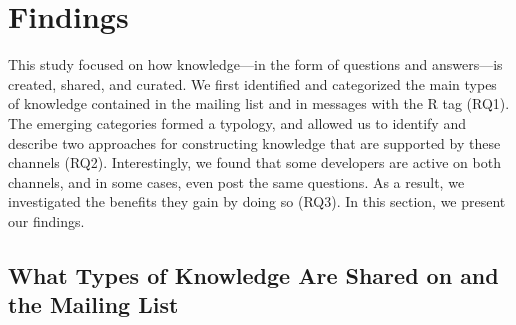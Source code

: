 \section{Findings}
\label{cha:findings}
This study focused on how knowledge---in the form of questions and answers---is created, shared, and curated. We first identified and categorized the main types of knowledge contained in the \RH mailing list and in \SO messages with the R tag (RQ1). The emerging categories formed a typology, and allowed us to identify and describe two approaches for constructing knowledge that are supported by these channels (RQ2). Interestingly, we found that some developers are active on both channels, and in some cases, even post the same questions. As a result, we investigated the benefits they gain by doing so (RQ3). In this section, we present our findings.

\subsection{What Types of Knowledge Are Shared on \SO and the \RH Mailing List}
\label{cha:findings-types}


